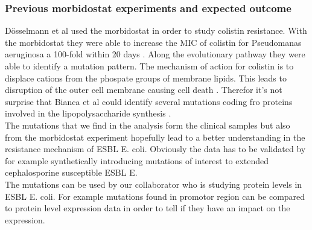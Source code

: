 \subsubsection{Previous morbidostat experiments and expected outcome}
Dösselmann et al \cite{doselmann_rapid_2017} used the morbidostat in order to study colistin resistance. With the morbidostat they were able to increase the MIC of colistin for Pseudomanas aeruginosa a 100-fold within 20 days \cite{doselmann_rapid_2017}. Along the evolutionary pathway they were able to identify a mutation pattern. The mechanism of action for colistin is to displace cations from the phospate groups of membrane lipids. This leads to disruption of the outer cell membrane causing cell death \cite{noauthor_colistin:_nodate}. Therefor it's not surprise that Bianca et al could identify several mutations coding fro proteins involved in the lipopolysaccharide synthesis \cite{doselmann_rapid_2017}. 
\\
The mutations that we find in the analysis form the clinical samples but also from the morbidostat experiment hopefully lead to a better understanding in the resistance mechanism of ESBL E. coli. Obviously the data has to be validated by for example  synthetically introducing mutations of interest to extended cephalosporine susceptible ESBL E. \\
The mutations can be used by our collaborator who is studying protein levels in ESBL E. coli. For example mutations found in promotor region can be compared to protein level expression data in order to tell if they have an impact on the expression.
